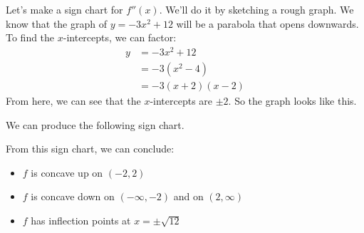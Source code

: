 \documentclass{article}
\begin{document}
\begin{enumerate}
\begin{enumerate}
    \begin{solution}
      Let's make a sign chart for $f''(x)$. We'll do it by sketching a rough graph. We know that the graph
      of $y=-3x^2+12$ will be a parabola that opens downwards. To find the $x$-intercepts, we can factor:
      \begin{align*}
          y &= -3x^2 + 12\\
          &= -3(x^2-4)\\
          &= -3(x+2)(x-2)
      \end{align*}
      From here, we can see that the $x$-intercepts are $\pm 2$. So the graph looks like this.  
       \begin{center}
      \end{center}

      We can produce the following sign chart.
       \begin{center}
      \end{center}
      
      From this sign chart, we can conclude:
      \begin{itemize}
        \item $f$ is concave up on $(-2,2)$
        \item $f$ is concave down on $(-\infty,-2)$ and on $(2, \infty)$
        \item $f$ has inflection points at $x=\pm \sqrt{12}$
      \end{itemize}
    \end{solution}


\end{enumerate}
\end{enumerate}
\end{document}
